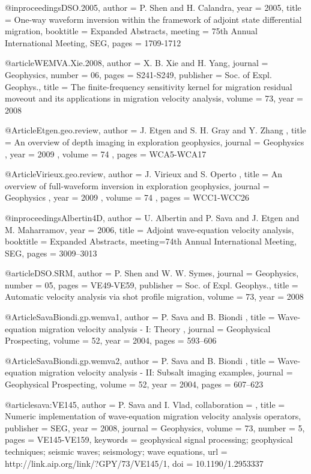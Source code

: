 {@inproceedings{DSO.2005,
  author    = {P. Shen and H. Calandra},
  year      = {2005},
  title     = {One-way waveform inversion within the framework of
adjoint state differential migration},
  booktitle = {Expanded Abstracts},
  meeting   = {75th Annual International Meeting, SEG},
  pages     = {1709-1712}
}

@article{WEMVA.Xie.2008,
  author = { X. B. Xie and H. Yang},
  journal = {Geophysics},
  number = {06},
  pages = {S241-S249},
  publisher = {Soc. of Expl. Geophys.},
  title = {The finite-frequency sensitivity kernel for migration
residual moveout and its applications in migration velocity analysis},
  volume = {73},
  year = {2008}}

@Article{Etgen.geo.review,
 author =  { J. Etgen and  S. H. Gray and Y. Zhang },
 title =   { An overview of depth imaging in exploration geophysics},
 journal = { Geophysics },
 year =    { 2009 },
 volume =  { 74 },
 pages =   { WCA5-WCA17 }
}

@Article{Virieux.geo.review,
 author =  { J. Virieux and S. Operto },
 title =   { An overview of full-waveform inversion in exploration geophysics},
 journal = { Geophysics },
 year =    { 2009 },
 volume =  { 74 },
 pages =   { WCC1-WCC26 }
}


@inproceedings{Albertin4D,
  author = {U. Albertin and P. Sava and J. Etgen and M.
Maharramov},
  year = {2006},
  title = { Adjoint wave-equation velocity analysis},
  booktitle = {Expanded Abstracts},
  meeting={74th Annual International Meeting, SEG},
  pages = {3009--3013}
}

@article{DSO.SRM,
  author = {P. Shen and W. W. Symes},
  journal = {Geophysics},
  number = {05},
  pages = {VE49-VE59},
  publisher = {Soc. of Expl. Geophys.},
  title = {Automatic velocity analysis via shot profile migration},
  volume = {73},
  year = {2008}}


@Article{SavaBiondi.gp.wemva1,
 author =  { P. Sava and B. Biondi },
 title =   { Wave-equation migration velocity analysis - {I}: {Theory} },
 journal = {Geophysical Prospecting},
 volume = {52},
 year =   {2004},
 pages =  {593--606}
}

@Article{SavaBiondi.gp.wemva2,
 author =  { P. Sava and B. Biondi },
 title =   { Wave-equation migration velocity analysis - {II}:
{Subsalt} imaging examples},
 journal = {Geophysical Prospecting},
 volume = {52},
 year =   {2004},
 pages =  {607--623}
}




@article{sava:VE145,
author = {P. Sava and I. Vlad},
collaboration = {},
title = {Numeric implementation of wave-equation migration velocity analysis operators},
publisher = {SEG},
year = {2008},
journal = {Geophysics},
volume = {73},
number = {5},
pages = {VE145-VE159},
keywords = {geophysical signal processing; geophysical techniques; seismic waves; seismology; wave equations},
url = {http://link.aip.org/link/?GPY/73/VE145/1},
doi = {10.1190/1.2953337}
}




}
